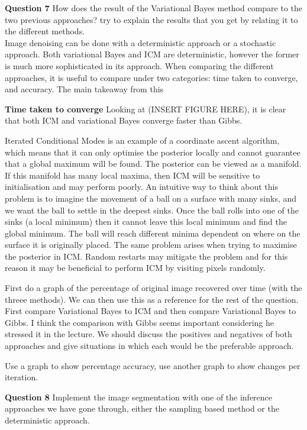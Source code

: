 \documentclass[10pt, a4paper, twocolumn]{article} %
\begin{document}
\textbf{Question 7}
How does the result of the Variational Bayes method compare to the two previous approaches? try to explain the results that you get by relating it to the different methods.\\

Image denoising can be done with a deterministic approach or a stochastic approach. Both variational Bayes and ICM are deterministic, however the former is much more sophisticated in its approach. When comparing the different approaches, it is useful to compare under two categories: time taken to converge, and accuracy. The main takeaway from this


\textbf{Time taken to converge}
Looking at (INSERT FIGURE HERE), it is clear that both ICM and variational Bayes converge faster than Gibbs. 



Iterated Conditional Modes is an example of a coordinate ascent algorithm, which means that it can only optimise the posterior locally and cannot guarantee that a global maximum will be found. The posterior can be viewed as a manifold. If this manifold has many local maxima, then ICM will be sensitive to initialisation and may perform poorly. An intuitive way to think about this problem is to imagine the movement of a ball on a surface with many sinks, and we want the ball to settle in the deepest sinks. Once the ball rolls into one of the sinks (a local minimum) then it cannot leave this local minimum and find the global minimum. The ball will reach different minima dependent on where on the surface it is originally placed. The same problem arises when trying to maximise the posterior in ICM. Random restarts may mitigate the problem and for this reason it may be beneficial to perform ICM by visiting pixels randomly. 

First do a graph of the percentage of original image recovered over time (with the threee methods). We can then use this as a reference for the rest of the question. First compare Variational Bayes to ICM and then compare Variational Bayes to Gibbs. I think the comparison with Gibbs seems important considering he stressed it in the lecture. We should discuss the positives and negatives of both approaches and give situations in which each would be the preferable approach. 

Use a graph to show percentage accuracy, use another graph to show changes per iteration.

\textbf{Question 8}
Implement the image segmentation with one of the inference approaches we have gone through, either the sampling based method or the deterministic approach.\\
\end{document}
